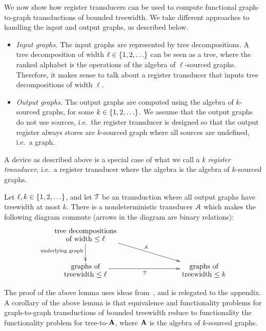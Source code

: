  We now show how register transducers can be used to compute functional graph-to-graph \mso transductions of bounded treewidth. We take different approaches to handling the input and output graphs, as described below.
\begin{itemize}
    \item \emph{Input graphs.} The input graphs are represented by tree decompositions. A tree decomposition of width $\ell \in \{1,2,\ldots\}$ can be seen as a tree, where the ranked alphabet is the operations of the algebra of $\ell$-sourced graphs.  Therefore, it makes sense to talk about a register transducer that inputs tree decompositions of width $\ell$. 
    \item \emph{Output graphs.} The output graphs are computed using the algebra of $k$-sourced graphs, for some $k \in \{1,2,\ldots\}$. We assume that the output graphs do not use sources, i.e.~the register transducer is designed so that the output register always stores are $k$-sourced graph where all sources are undefined, i.e.~a graph.
\end{itemize}

A device as described above is a special case of what we call a \emph{\treetotreewidth k register transducer}, i.e.~a register transducer where the algebra is the algebra of $k$-sourced graphs.  

\begin{lemma}\label{lem:transduction-to-registers}
    Let $\ell, k \in \{1,2,\ldots\}$, and  let ${\mathcal T}$ be an \mso transduction where all output graphs have treewidth at most $k$. There is a nondeterministic  transducer ${\mathcal A}$ which makes the following diagram commute (arrows in the diagram are binary relations):
    \begin{align*}
    \xymatrix@C=3cm{
        \txt{tree decompositions\\ of width $\le \ell$}
        \ar[d]_{\txt{\scriptsize underlying graph}}
         \ar[dr]^\Aa\\
        \txt{graphs of\\ treewidth $\le \ell$}\ar[r]_\Tt &
        \txt{graphs  of\\ treewidth $\le k$} 
    }
    \end{align*}
\end{lemma}
The proof of the above lemma uses ideas from~\cite{courcelleMonadicSecondorderLogic1990,bloem_comparison_2000,alurStreamingTreeTransducers2017}, and  is relegated to the appendix.   A corollary of the above lemma is that  equivalence and functionality  problems for graph-to-graph \mso transductions of bounded treewidth  reduce to functionality the functionality problem  for tree-to-$\mathbf{A}$, where $\mathbf{A}$ is the algebra of $k$-sourced graphs.


